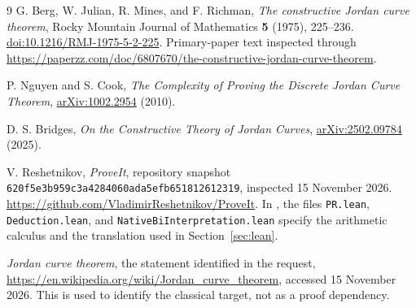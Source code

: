\documentclass[11pt]{article}
\theoremstyle{definition}
\begin{document}
\begingroup
\small
\setlength{\parskip}{0pt}
\tableofcontents
\endgroup
\newpage






\clearpage
\begin{thebibliography}{9}
G. Berg, W. Julian, R. Mines, and F. Richman,
\emph{The constructive Jordan curve theorem},
Rocky Mountain Journal of Mathematics \textbf{5} (1975), 225--236.
\href{https://doi.org/10.1216/RMJ-1975-5-2-225}{doi:10.1216/RMJ-1975-5-2-225}.
Primary-paper text inspected through
\url{https://paperzz.com/doc/6807670/the-constructive-jordan-curve-theorem}.

P. Nguyen and S. Cook,
\emph{The Complexity of Proving the Discrete Jordan Curve Theorem},
\href{https://arxiv.org/abs/1002.2954}{arXiv:1002.2954} (2010).

D. S. Bridges,
\emph{On the Constructive Theory of Jordan Curves},
\href{https://arxiv.org/abs/2502.09784}{arXiv:2502.09784} (2025).

V. Reshetnikov, \emph{ProveIt}, repository snapshot\\
\texttt{620f5e3b959c3a4284060ada5efb651812612319}, inspected
15 November 2026.
\url{https://github.com/VladimirReshetnikov/ProveIt}.
In ,
the files \texttt{PR.lean}, \texttt{Deduction.lean}, and
\texttt{NativeBiInterpretation.lean} specify the arithmetic calculus and
the translation used in Section~\ref{sec:lean}.

\emph{Jordan curve theorem}, the statement identified in the request,
\url{https://en.wikipedia.org/wiki/Jordan_curve_theorem},
accessed 15 November 2026.
This is used to identify the classical target, not as a proof dependency.
\end{thebibliography}
\end{document}
